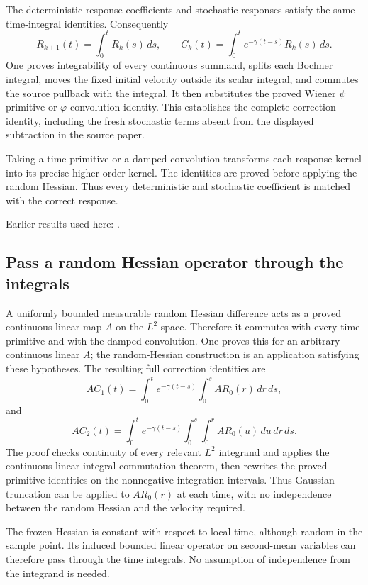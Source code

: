 \documentclass[11pt,a4paper]{report}
\begin{document}
The deterministic response coefficients and stochastic responses satisfy the same time-integral identities. Consequently \[R_{k+1}(t)=\int_0^tR_k(s)\,ds,\qquad C_k(t)=\int_0^te^{-\gamma(t-s)}R_k(s)\,ds.\] One proves integrability of every continuous summand, splits each Bochner integral, moves the fixed initial velocity outside its scalar integral, and commutes the source pullback with the integral. It then substitutes the proved Wiener \(\psi\) primitive or \(\varphi\) convolution identity. This establishes the complete correction identity, including the fresh stochastic terms absent from the displayed subtraction in the source paper.



Taking a time primitive or a damped convolution transforms each response kernel into its precise higher-order kernel. The identities are proved before applying the random Hessian. Thus every deterministic and stochastic coefficient is matched with the correct response.



Earlier results used here: \cite[Section~3.8.17]{LangevinLean2026ULASC}.
\subsection{\texorpdfstring{Pass a random Hessian operator through the integrals}{Pass a random Hessian operator through the integrals}}
\label{report-step-KineticLangevin-FreeOUCorrection-lean-3}


A uniformly bounded measurable random Hessian difference acts as a proved continuous linear map \(A\) on the \(L^{2}\) space. Therefore it commutes with every time primitive and with the damped convolution. One proves this for an arbitrary continuous linear \(A\); the random-Hessian construction is an application satisfying these hypotheses. The resulting full correction identities are \[AC_1(t)=\int_0^te^{-\gamma(t-s)}\int_0^sAR_0(r)\,dr\,ds,\] and \[AC_2(t)=\int_0^te^{-\gamma(t-s)}\int_0^s\int_0^rAR_0(u)\,du\,dr\,ds.\] The proof checks continuity of every relevant \(L^{2}\) integrand and applies the continuous linear integral-commutation theorem, then rewrites the proved primitive identities on the nonnegative integration intervals. Thus Gaussian truncation can be applied to \(AR_0(r)\) at each time, with no independence between the random Hessian and the velocity required.



The frozen Hessian is constant with respect to local time, although random in the sample point. Its induced bounded linear operator on second-mean variables can therefore pass through the time integrals. No assumption of independence from the integrand is needed.
\end{document}
